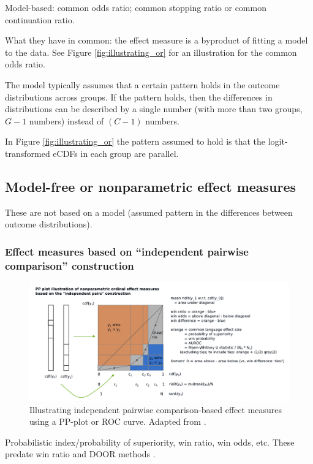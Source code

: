 \documentclass[
  11pt,
  fleqn
]{article}
\begin{document}
Model-based: common odds ratio; common stopping ratio or common continuation
ratio.

What they have in common: the effect measure is a byproduct of fitting a model
to the data. See Figure \ref{fig:illustrating_or} for an illustration
for the common odds ratio.

The model typically assumes that a certain pattern holds in the outcome
distributions across groups. If the pattern holds, then the differences in
distributions can be described by a single number (with more than two groups,
$G-1$ numbers) instead of $(C-1)$ numbers.

In Figure \ref{fig:illustrating_or} the pattern assumed to hold is
that the logit-transformed eCDFs in each group are parallel.

\subsection{Model-free or nonparametric effect measures}

These are not based on a model (assumed pattern in the differences
between outcome distributions).

\subsubsection{Effect measures based on ``independent pairwise
comparison'' construction}

\begin{figure}
  \includegraphics[width=7.5in]{effect_measures_pp_plot.pdf}
  \caption{Illustrating independent pairwise comparison-based effect
    measures using a PP-plot or ROC curve. Adapted from
  \citet{smithsonReceiverOperatingCharacteristic2023}.}
  \label{fig:illustrating_pairwise_comparisons}
\end{figure}

Probabilistic index/probability of
superiority, win ratio, win odds, etc. These predate win ratio and
DOOR methods
\citep[e.g.][p.~14]{agrestiAnalysisOrdinalCategorical2010}.
\end{document}
